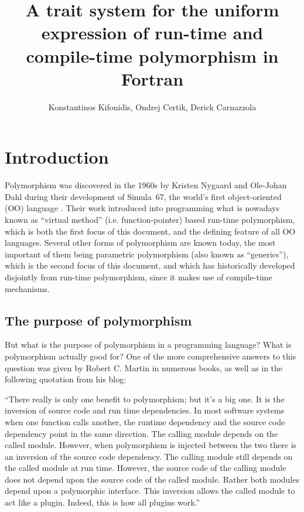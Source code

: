 \documentclass[11pt,oneside]{article}
\begin{document}
\title{A trait system for the uniform expression of run-time
       and compile-time polymorphism in Fortran}

\author{Konstantinos Kifonidis, Ondrej Certik, Derick Carnazzola}

\maketitle


\section{Introduction}

Polymorphism was discovered in the 1960s by Kristen Nygaard and
Ole-Johan Dahl during their development of Simula~67, the world's
first object-oriented (OO) language \cite{Dahl_01}. Their work
introduced into programming what is nowadays known as ``virtual
method'' (i.e. function-pointer) based run-time polymorphism, which is
both the first focus of this document, and the defining feature of all
OO languages. Several other forms of polymorphism are known today, the
most important of them being parametric polymorphism (also known as
``generics''), which is the second focus of this document, and which
has historically developed disjointly from run-time polymorphism,
since it makes use of compile-time mechanisms.


\subsection{The purpose of polymorphism}

But what is the purpose of polymorphism in a programming language?
What is polymorphism actually good for? One of the more comprehensive
answers to this question was given by Robert C. Martin in numerous
books, as well as in the following quotation from his blog:

\begin{displayquote}
``There really is only one benefit to polymorphism; but it's a big
  one. It is the inversion of source code and run time
  dependencies. In most software systems when one function calls
  another, the runtime dependency and the source code dependency point
  in the same direction. The calling module depends on the called
  module. However, when polymorphism is injected between the two there
  is an inversion of the source code dependency. The calling module
  still depends on the called module at run time. However, the source
  code of the calling module does not depend upon the source code of
  the called module. Rather both modules depend upon a polymorphic
  interface. This inversion allows the called module to act like a
  plugin. Indeed, this is how all plugins work.''
\end{displayquote}
\end{document}

